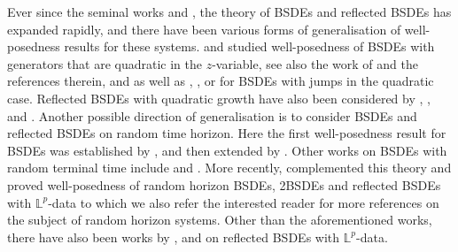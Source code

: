 \documentclass[10pt]{article} %
\def \L{\mathbb{L}}
\begin{document}
\medskip
Ever since the seminal works \cite{pardoux1990adapted} and \cite{el1997reflected}, the theory of BSDEs and reflected BSDEs has expanded rapidly, and there have been various forms of generalisation of well-posedness results for these systems. \citeauthor*{kobylanski1997resultats} \cite{kobylanski1997resultats} and \citeauthor*{tevzadze2008solvability} \cite{tevzadze2008solvability} studied well-posedness of BSDEs with generators that are quadratic in the $z$-variable, see also the work of \citeauthor*{jackson2022characterization} \cite{jackson2022characterization} and the references therein, and \citeauthor*{kazi2015quadratic1} \cite{kazi2015quadratic1,kazi2016quadratic} as well as \citeauthor*{karoui2016quadratic} \cite{karoui2016quadratic}, \citeauthor*{jeanblanc2012robust} \cite{jeanblanc2012robust}, or \citeauthor*{matoussi2019exponential} \cite{matoussi2019exponential} for BSDEs with jumps in the quadratic case. Reflected BSDEs with quadratic growth have also been considered by \citeauthor*{kobylanski2002reflected} \cite{kobylanski2002reflected}, \citeauthor*{lepeltier2007reflected} \cite{lepeltier2007reflected}, and \citeauthor*{bayraktar2012quadratic} \cite{bayraktar2012quadratic}. Another possible direction of generalisation is to consider BSDEs and reflected BSDEs on random time horizon. Here the first well-posedness result for BSDEs was established by \citeauthor*{peng1991probabilistic} \cite{peng1991probabilistic}, and then extended by \citeauthor*{darling1997backwards} \cite{darling1997backwards}. Other works on BSDEs with random terminal time include \citeauthor*{briand1998stability} \cite{briand1998stability} and \citeauthor*{royer2004bsdes} \cite{royer2004bsdes}. More recently, \citeauthor*{lin2020second} \cite{lin2020second} complemented this theory and proved well-posedness of random horizon BSDEs, 2BSDEs and reflected BSDEs with $\L^p$-data to which we also refer the interested reader for more references on the subject of random horizon systems. Other than the aforementioned works, there have also been works by \citeauthor*{rozkosz2012solutions} \cite{rozkosz2012solutions}, \citeauthor*{klimsiak2012reflected2} \cite{klimsiak2012reflected2} and \citeauthor*{klimsiak2019reflected} \cite{klimsiak2019reflected} on reflected BSDEs with $\L^p$-data.
\end{document}
